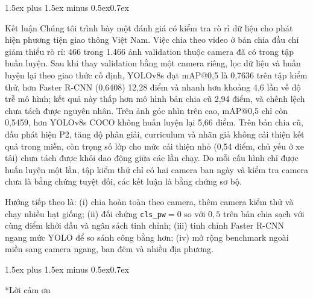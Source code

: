 \documentclass[10pt,journal,letterpaper]{IEEEtran}
\makeatletter
\renewcommand\section{\@startsection{section}{1}{\z@}%
  {1.5ex plus 1.5ex minus 0.5ex}{0.7ex}{\normalfont\scshape\raggedright}}
\makeatother
\begin{document}
\section{Kết luận}
Chúng tôi trình bày một đánh giá có kiểm tra rò rỉ dữ liệu cho phát hiện phương tiện giao thông Việt Nam. Việc chia theo video ở bản chia đầu chỉ giảm thiểu rò rỉ: 466 trong 1.466 ảnh validation thuộc camera đã có trong tập huấn luyện. Sau khi thay validation bằng một camera riêng, lọc dữ liệu và huấn luyện lại theo giao thức cố định, YOLOv8s đạt mAP@0,5 là 0,7636 trên tập kiểm thử, hơn Faster R-CNN (0,6408) 12,28 điểm và nhanh hơn khoảng 4,6 lần về độ trễ mô hình; kết quả này thấp hơn mô hình bản chia cũ 2,94 điểm, và chênh lệch chưa tách được nguyên nhân. Trên ảnh góc nhìn trên cao, mAP@0,5 chỉ còn 0,5459, hơn YOLOv8s COCO không huấn luyện lại 5,66 điểm. Trên bản chia cũ, đầu phát hiện P2, tăng độ phân giải, curriculum và nhãn giả không cải thiện kết quả trong miền, còn trọng số lớp cho mức cải thiện nhỏ (0,54 điểm, chủ yếu ở xe tải) chưa tách được khỏi dao động giữa các lần chạy. Do mỗi cấu hình chỉ được huấn luyện một lần, tập kiểm thử chỉ có hai camera ban ngày và kiểm tra camera chưa là bằng chứng tuyệt đối, các kết luận là bằng chứng sơ bộ.

Hướng tiếp theo là: (i) chia hoàn toàn theo camera, thêm camera kiểm thử và chạy nhiều hạt giống; (ii) đối chứng \texttt{cls\_pw}$=0$ so với $0{,}5$ trên bản chia sạch với cùng điểm khởi đầu và ngân sách tinh chỉnh; (iii) tinh chỉnh Faster R-CNN ngang mức YOLO để so sánh công bằng hơn; (iv) mở rộng benchmark ngoài miền sang camera ngang, ban đêm và nhiều địa phương.

\section*{Lời cảm ơn}
\end{document}
